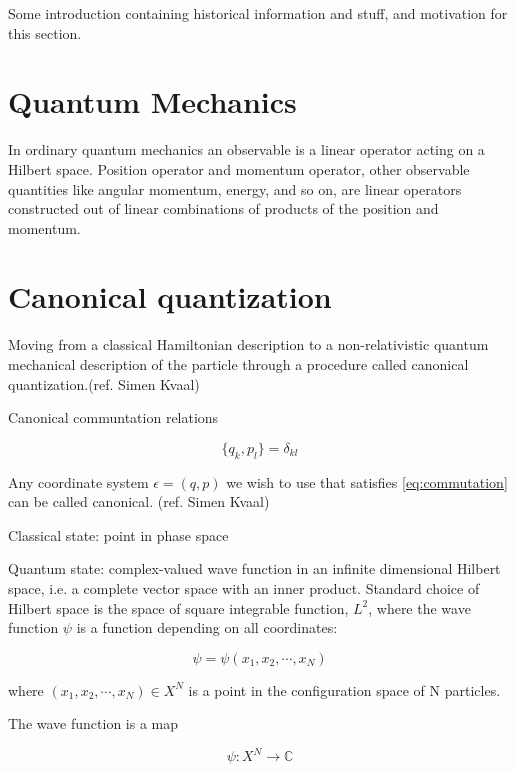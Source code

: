Some introduction containing historical information and stuff, and motivation for this section. 

\section{Quantum Mechanics}

In ordinary quantum mechanics an observable is a linear operator acting on a Hilbert space. Position operator and momentum operator, other observable quantities like angular momentum, energy, and so on, are linear operators constructed out of linear combinations of products of the position and momentum.\cite{kvaal}

\section{Canonical quantization}

Moving from a classical Hamiltonian description to a non-relativistic quantum mechanical description of the particle through a procedure called canonical quantization.(ref. Simen Kvaal)

Canonical communtation relations 

\begin{equation} \label{eq:commutation}
\{q_k, p_l\} = \delta_{kl}
\end{equation}

Any coordinate system $\epsilon = (q,p)$ we wish to use that satisfies \ref{eq:commutation} can be called canonical. (ref. Simen Kvaal)

Classical state: point in phase space

Quantum state: complex-valued wave function in an infinite dimensional Hilbert space, i.e. a complete vector space with an inner product.
Standard choice of Hilbert space is the space of square integrable function, $L^2$, where the wave function $\psi$ is a function depending on all coordinates:

\begin{equation}
\psi = \psi (x_1, x_2, \cdots, x_N)
\end{equation}

where $(x_1, x_2, \cdots , x_N) \in X^N$ is a point in the configuration space of N particles. 

The wave function is a map 

\begin{equation}
\psi : X^N \longrightarrow \mathbb{C}
\end{equation}

